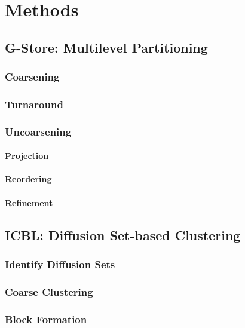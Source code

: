 \chapter{Methods}\label{\positionnumber} 
\section{G-Store: Multilevel Partitioning}\label{\positionnumber}
    \subsection{Coarsening}\label{\positionnumber}
    \subsection{Turnaround}\label{\positionnumber}
    \subsection{Uncoarsening}\label{\positionnumber}
        \subsubsection{Projection}\label{\positionnumber}
        \subsubsection{Reordering}\label{\positionnumber}
        \subsubsection{Refinement}\label{\positionnumber}

\section{ICBL: Diffusion Set-based Clustering}\label{\positionnumber}
    \subsection{Identify Diffusion Sets}\label{\positionnumber}
    \subsection{Coarse Clustering}\label{\positionnumber}
    \subsection{Block Formation}\label{\positionnumber}
